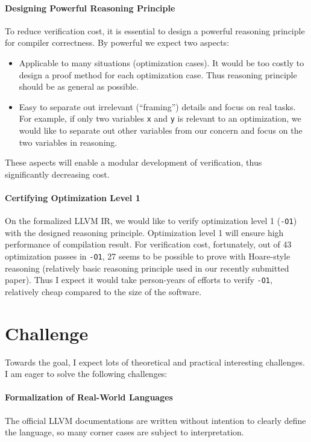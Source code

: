 \documentclass[nocopyrightspace]{sigplanconf}
\begin{document}
\paragraph{Designing Powerful Reasoning Principle}
To reduce verification cost, it is essential to design a powerful
reasoning principle for compiler correctness.  By powerful we expect
two aspects:
\begin{itemize}
\item Applicable to many situations (optimization cases).  It would be
  too costly to design a proof method for each optimization case.
  Thus reasoning principle should be as general as possible.
\item Easy to separate out irrelevant (``framing'') details and focus
  on real tasks.  For example, if only two variables \texttt{x} and
  \texttt{y} is relevant to an optimization, we would like to separate
  out other variables from our concern and focus on the two variables
  in reasoning.
\end{itemize}
These aspects will enable a modular development of verification, thus
significantly decreasing cost.

\paragraph{Certifying Optimization Level 1}
On the formalized LLVM IR, we would like to verify optimization level
1 (\texttt{-O1}) with the designed reasoning principle.  Optimization
level 1 will ensure high performance of compilation result.  For
verification cost, fortunately, out of 43 optimization passes in
\texttt{-O1}, 27 seems to be possible to prove with Hoare-style
reasoning (relatively basic reasoning principle used in our recently
submitted paper).  Thus I expect it would take person-years of efforts
to verify \texttt{-O1}, relatively cheap compared to the size of the
software.

\section{Challenge}
Towards the goal, I expect lots of theoretical and practical
interesting challenges.  I am eager to solve the following challenges:

\paragraph{Formalization of Real-World Languages}
The official LLVM documentations are written without intention to
clearly define the language, so many corner cases are subject to
interpretation.
\end{document}
